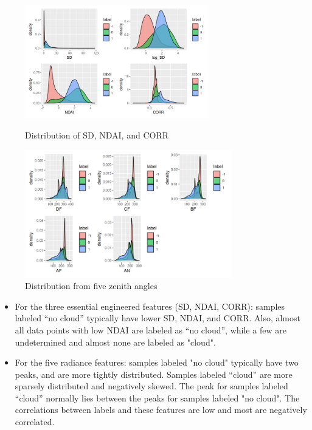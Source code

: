\documentclass[11pt]{article}
\theoremstyle{definition}
\begin{document}
\begin{figure}[h]
\begin{minipage}[t]{0.5\textwidth}
\centering
\includegraphics[width=8cm]{figures/1c2.png}
\caption{Distribution of SD, NDAI, and CORR}
\label{1c2}
\end{minipage}
\begin{minipage}[t]{0.5\textwidth}
\centering
\includegraphics[width=9cm]{figures/1c3.png}
\caption{Distribution from five zenith angles}
\label{1c3}
\end{minipage}
\end{figure}
\FloatBarrier 

\begin{itemize}
\item For the three essential engineered features (SD, NDAI, CORR): samples labeled ``no cloud'' typically have lower SD, NDAI, and CORR. Also, almost all data points with low NDAI are labeled as ``no cloud'', while a few are undetermined and almost none are labeled as "cloud".

\item For the five radiance features: samples labeled "no cloud" typically have two peaks, and are more tightly distributed. Samples labeled ``cloud'' are more sparsely distributed and negatively skewed. The peak for samples labeled ``cloud'' normally lies between the peaks for samples labeled "no cloud". The correlations between labels and these features are low and most are negatively correlated.
\end{itemize}
\end{document}

